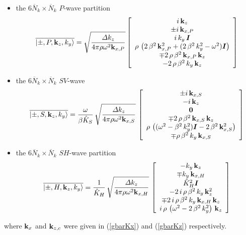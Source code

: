 \documentclass[11pt,a4paper]{article}
\newcommand{\bmi}[1]{\mbox{\boldmath$\mit #1$\unboldmath}}
\begin{document}
\begin{itemize}
\item the $6 \overline{N}_k \times \overline{N}_k$ $P$-wave partition
\begin{equation} \label{PxeigenSuper}
\overline{\left|\pm,P, {\bf k}_z,k_{y}  \right\rangle}=
\sqrt{\frac{{\mit \Delta} k_{z}}{{4 \pi \rho {\omega
}^{  2}{\bf  k}_{
x, P }}}}
\left[\begin{array}{c} i\,{\bf k}_{z}\\ \pm i\,{\bf k}_{x,P}\\
i\,k_{y}\,{\bmi I}\\
  \rho \,\left( 2\,{\beta^2}\,{{\bf k}_{x,P}^2} + ( 2\,{\beta^2}\,{k_{y}^2} -
     {\omega^2}){\bmi I} \right) \\ \mp 2\,\rho\,{\beta^2}\,{\bf k}_{x,P}\,{\bf k}_{z} \\
  - 2\,\rho\,{\beta^2}\,k_{y}\,{\bf k}_{z} \end{array}\right]
\end{equation}

\item  the $6 \overline{N}_k \times \overline{N}_k$ $SV$-wave
\begin{equation} \label{SVxeigenSuper}
\overline{\left|\pm,S, {\bf k}_z,k_{y}  \right\rangle}=
\frac{\omega }{\beta \hat{K}_{S}}\,\sqrt{\frac{{\mit \Delta} k_{z}}{{4 \pi \rho {\omega
}^{  2}{\bf  k}_{
x, S }}}}\,\left[\begin{array}{c}
\pm i\,{\bf k}_{x,S}\\
- i\,{\bf k}_{z}\\ {\bf 0} \\
\mp 2\,\rho\,{\beta^2}\,{\bf k}_{x,S}\,{\bf k}_{z} \\
  \rho \,\left(({\omega^2} - {\beta^2}\,{k_{y}^2}) {\bmi
  I}-2\,{\beta^2}\,{{\bf k}_{x,S}^2}   \right) \\
 \mp \rho\,{\beta^2}\,k_{y}\,{\bf k}_{x,S} \end{array}\right]
\end{equation}

\item the $6 \overline{N}_k \times \overline{N}_k$ $SH$-wave partition
\begin{equation} \label{SHxeigenSuper}
\overline{\left|\pm,H, {\bf k}_z, k_{y}  \right\rangle}=\frac{1 }{\hat{K}_{H}}\,
\sqrt{\frac{{\mit \Delta} k_{z}}{{4 \pi \rho {\omega
}^{  2}{\bf  k}_{
x, H }}}}\,\left[\begin{array}{c}
- k_{y}\,{\bf k}_{z} \\ \mp k_{y}\,{\bf k}_{x,H} \\
  \hat{K}_{H}^2 {\bmi I}\\
-2\,i\,\rho \,{\beta^2}\,k_{y}\,{{\bf k}_{z}^2}\\
  \mp 2\,i\,\rho\,{\beta^2}\,k_{y}\,{\bf k}_{x,H}\,{\bf k}_{z} \\
   i\,\rho\,\left(  {\omega^2} -2\,{\beta^2}\,{k_{y}^2}
  \right)\,{\bf k}_{z}  \end{array}\right]
\end{equation}

\end{itemize}
where  ${\bf  k}_{x}$ and ${\bf  k}_{z,c}$ were given in
(\ref{gbarKx}) and (\ref{gbarKz}) respectively.
\end{document}
